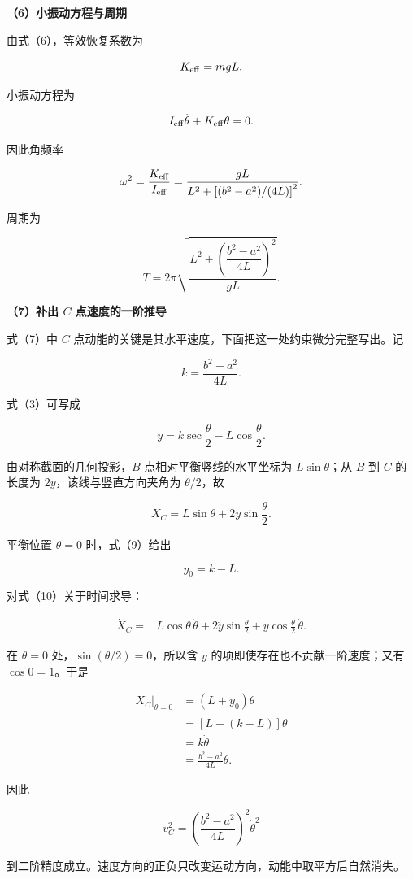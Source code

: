 \documentclass[12pt,a4paper,UTF8]{ctexart}
\begin{document}
\textbf{（6）小振动方程与周期}

由式（6），等效恢复系数为

\[
K_{\rm eff}=mgL.
\]

小振动方程为

\[
I_{\rm eff}\ddot\theta+K_{\rm eff}\theta=0.
\]

因此角频率

\[
\omega^2
=\frac{K_{\rm eff}}{I_{\rm eff}}
=\frac{gL}{L^2+\left[(b^2-a^2)/(4L)\right]^2}.
\]

周期为

\[
\boxed{
T=2\pi
\sqrt{
\frac{
L^2+\left(\dfrac{b^2-a^2}{4L}\right)^2
}{gL}}
}.
\]

\textbf{（7）补出 \(C\) 点速度的一阶推导}

式（7）中 \(C\)
点动能的关键是其水平速度，下面把这一处约束微分完整写出。记

\[
k=\frac{b^2-a^2}{4L}.
\]

式（3）可写成

\[
y=k\sec\frac\theta2-L\cos\frac\theta2.
\tag{9}
\]

由对称截面的几何投影，\(B\) 点相对平衡竖线的水平坐标为
\(L\sin\theta\)；从 \(B\) 到 \(C\) 的长度为 \(2y\)，该线与竖直方向夹角为
\(\theta/2\)，故

\[
X_C=L\sin\theta+2y\sin\frac\theta2.
\tag{10}
\]

平衡位置 \(\theta=0\) 时，式（9）给出

\[
y_0=k-L.
\tag{11}
\]

对式（10）关于时间求导：

\[
\begin{aligned}
\dot X_C
={}&L\cos\theta\,\dot\theta
+2\dot y\sin\frac\theta2
+y\cos\frac\theta2\,\dot\theta.
\end{aligned}
\tag{12}
\]

在 \(\theta=0\) 处，\(\sin(\theta/2)=0\)，所以含 \(\dot y\)
的项即使存在也不贡献一阶速度；又有 \(\cos0=1\)。于是

\[
\begin{aligned}
\dot X_C\big|_{\theta=0}
&=(L+y_0)\dot\theta\\
&=[L+(k-L)]\dot\theta\\
&=k\dot\theta\\
&=\frac{b^2-a^2}{4L}\dot\theta.
\end{aligned}
\tag{13}
\]

因此

\[
v_C^2=\left(\frac{b^2-a^2}{4L}\right)^2\dot\theta^2
\]

到二阶精度成立。速度方向的正负只改变运动方向，动能中取平方后自然消失。
\end{document}
